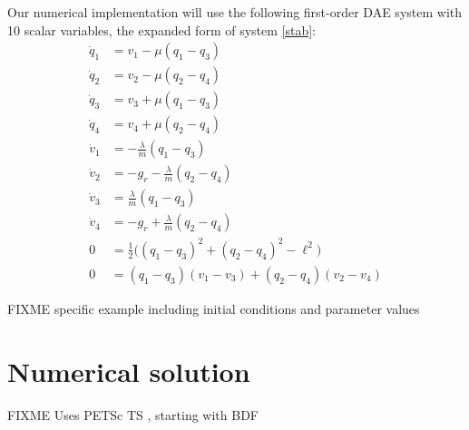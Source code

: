 \documentclass[letterpaper,final,12pt,reqno]{amsart}
\begin{document}
Our numerical implementation will use the following first-order DAE system with 10 scalar variables, the expanded form of system \eqref{stab}:
\begin{subequations}
\label{rawstab}
\begin{align}
\dot q_1 &= v_1 - \mu (q_1 - q_3) \\
\dot q_2 &= v_2 - \mu (q_2 - q_4) \\
\dot q_3 &= v_3 + \mu (q_1 - q_3) \\
\dot q_4 &= v_4 + \mu (q_2 - q_4) \\
\dot v_1 &= - \frac{\lambda}{m} (q_1 - q_3) \\
\dot v_2 &= - g_r - \frac{\lambda}{m} (q_2 - q_4) \\
\dot v_3 &= \frac{\lambda}{m} (q_1 - q_3) \\
\dot v_4 &= - g_r + \frac{\lambda}{m} (q_2 - q_4) \\
       0 &= \frac{1}{2} \Big((q_1 - q_3)^2 + (q_2 - q_4)^2 - \ell^2\Big) \\
       0 &= (q_1 - q_3)(v_1 - v_3) + (q_2 - q_4) (v_2 - v_4)
\end{align}
\end{subequations}

FIXME specific example including initial conditions and parameter values


\section{Numerical solution}

FIXME Uses PETSc TS \cite{Balayetal2021,Bueler2021}, starting with BDF

\small

\bigskip


\end{document}
